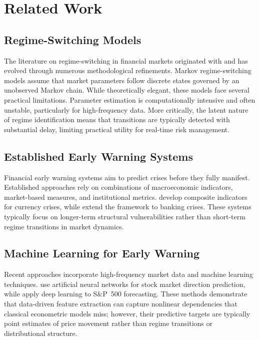 \documentclass[11pt]{article}
\begin{document}
\section{Related Work}

\subsection{Regime-Switching Models}

The literature on regime-switching in financial markets originated with
\citet{Hamilton1989} and has evolved through numerous methodological
refinements. Markov regime-switching models assume that market
parameters follow discrete states governed by an unobserved Markov
chain. While theoretically elegant, these models face several practical
limitations. Parameter estimation is computationally intensive and often
unstable, particularly for high-frequency data. More critically, the
latent nature of regime identification means that transitions are
typically detected with substantial delay, limiting practical utility
for real-time risk management.

\subsection{Established Early Warning Systems}

Financial early warning systems aim to predict crises before they fully
manifest. Established approaches rely on combinations of macroeconomic
indicators, market-based measures, and institutional metrics.
\citet{Kaminsky1999} develop composite indicators for currency crises,
while \citet{DemirgucKunt2000} extend the framework to banking crises.
These systems typically focus on longer-term structural vulnerabilities
rather than short-term regime transitions in market dynamics.

\subsection{Machine Learning for Early Warning}

Recent approaches incorporate high-frequency market data and machine
learning techniques. \citet{Sevim2014} use artificial neural networks
for stock market direction prediction, while \citet{Krauss2017} apply
deep learning to S\&P~500 forecasting. These methods demonstrate that
data-driven feature extraction can capture nonlinear dependencies that
classical econometric models miss; however, their predictive targets are
typically point estimates of price movement rather than regime
transitions or distributional structure.
\end{document}
